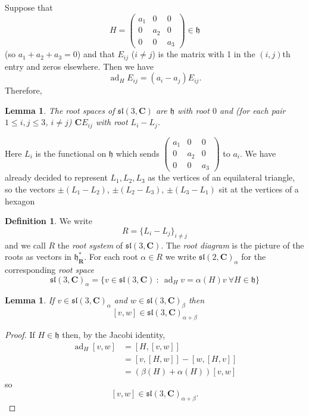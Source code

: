 \documentclass[12pt]{article}
\newcommand{\CC}{\mathbf{C}}
\newcommand{\RR}{\mathbf{R}}
\newcommand{\OP}{\operatorname}
\newcommand{\ad}{\OP{ad}}
\newtheorem{lma}[thm]{Lemma}
\theoremstyle{definition}
\newtheorem{dfn}[thm]{Definition}
\theoremstyle{check}
\theoremstyle{remark}
\theoremstyle{TheoremNum}
\begin{document}
Suppose that
\[H=\left(\begin{array}{ccc}
a_1 & 0 & 0\\
0 & a_2 & 0\\
0 & 0 & a_3
\end{array}\right)\in\mathfrak{h}\]
(so $a_1+a_2+a_3=0$) and that $E_{ij}$ ($i\neq j$) is the matrix with 1 in the $(i,j)$th entry and zeros elsewhere. Then we have
\[\ad_HE_{ij}=(a_i-a_j)E_{ij}.\]
Therefore,
\begin{lma}
The root spaces of $\mathfrak{sl}(3,\CC)$ are $\mathfrak{h}$ with root $0$ and (for each pair $1\leq i,j\leq 3$, $i\neq j$) $\CC E_{ij}$ with root $L_i-L_j$.
\end{lma}
Here $L_i$ is the functional on $\mathfrak{h}$ which sends $\left(\begin{array}{ccc}
a_1 & 0 & 0\\
0 & a_2 & 0\\
0 & 0 & a_3
\end{array}\right)$ to $a_i$. We have already decided to represent $L_1,L_2,L_3$ as the vertices of an equilateral triangle, so the vectors $\pm(L_1-L_2)$, $\pm(L_2-L_3)$, $\pm(L_3-L_1)$ sit at the vertices of a hexagon

\slthree

\begin{dfn}
We write
\[R=\{L_i-L_j\}_{i\neq j}\]
and we call $R$ the {\em root system} of $\mathfrak{sl}(3,\CC)$. The {\em root diagram} is the picture of the roots as vectors in $\mathfrak{h}^*_{\RR}$. For each root $\alpha\in R$ we write $\mathfrak{sl}(2,\CC)_{\alpha}$ for the corresponding {\em root space}
\[\mathfrak{sl}(3,\CC)_{\alpha}=\{v\in\mathfrak{sl}(3,\CC)\ :\ \ad_Hv=\alpha(H)v\ \forall H\in\mathfrak{h}\}\]
\end{dfn}

\begin{lma}
If $v\in\mathfrak{sl}(3,\CC)_{\alpha}$ and $w\in\mathfrak{sl}(3,\CC)_{\beta}$ then
\[[v,w]\in\mathfrak{sl}(3,\CC)_{\alpha+\beta}\]
\end{lma}
\begin{proof}
If $H\in\mathfrak{h}$ then, by the Jacobi identity,
\begin{align*}
\ad_H[v,w]&=[H,[v,w]]\\
&=[v,[H,w]]-[w,[H,v]]\\
&=(\beta(H)+\alpha(H))[v,w]
\end{align*}
so
\[[v,w]\in\mathfrak{sl}(3,\CC)_{\alpha+\beta}.\]
\end{proof}
\end{document}
